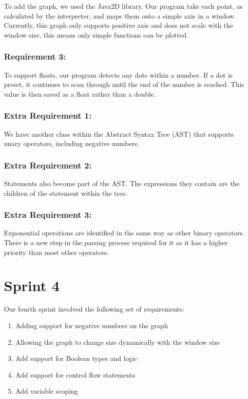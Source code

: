 \documentclass[a4paper, oneside, 11pt]{report}
\begin{document}
To add the graph, we used the Java2D library. Our program take each point, as calculated by the interpreter, and maps them onto a simple axis in a window. Currently, this graph only supports positive axis and does not scale with the window size, this means only simple functions can be plotted.

\subsubsection {Requirement 3:}

To support floats, our program detects any dots within a number. If a dot is preset, it continues to scan through until the end of the number is reached. This value is then saved as a float rather than a double.

\subsubsection {Extra Requirement 1:}

We have another class within the Abstract Syntax Tree (AST) that supports unary operators, including negative numbers.

\subsubsection {Extra Requirement 2:}

Statements also become part of the AST. The expressions they contain are the children of the statement within the tree.

\subsubsection {Extra Requirement 3:}

Exponential operations are identified in the same way as other binary operators. There is a new step in the parsing process required for it as it has a higher priority than most other operators.


\section{Sprint 4}
Our fourth sprint involved the following set of requirements:
\begin{enumerate}
\item Adding support for negative numbers on the graph
\item Allowing the graph to change size dynamically with the window size
\item Add support for Boolean types and logic
\item Add support for control flow statements
\item Add variable scoping
\end{enumerate}
\end{document}
